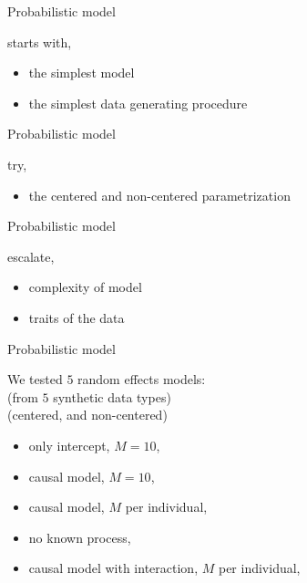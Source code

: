 %
\begin{lhframe}[rhgraphic={\texttt{[image: model\_design1.png]}}]
	{Probabilistic model}
	
	starts with,
	\begin{itemize}
		\item the simplest model
		\item the simplest data generating procedure
	\end{itemize}
\end{lhframe}
%
%
\begin{lhframe}[rhgraphic={\texttt{[image: model\_design2.png]}}]
	{Probabilistic model}
	
	try,
	\begin{itemize}
		\item the centered and non-centered parametrization
	\end{itemize}
\end{lhframe}
%
%
\begin{lhframe}[rhgraphic={\texttt{[image: model\_design3.png]}}]
	{Probabilistic model}
	
	escalate,
	\begin{itemize}
		\item complexity of model
		\item traits of the data
	\end{itemize}
\end{lhframe}
%
%
\begin{lhframe}[rhgraphic={\texttt{[image: model\_design3.png]}}]
	{Probabilistic model}
	
	We tested $5$ random effects models: \\
	{\small (from $5$ synthetic data types)} \\ 
	{\small (centered, and non-centered)}
	\begin{itemize}
		\item only intercept, $M=10$, 
		\item causal model, $M=10$,
		\item causal model, $M$ per individual,
		\item no known process,
		\item causal model with interaction, $M$ per individual,
	\end{itemize}
\end{lhframe}
%
%
